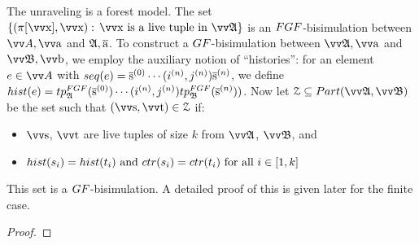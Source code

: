 \thminfunraveling*
\begin{proofsketch}
  The unraveling is a forest model.
  The set $\{(\pi[\elemtuptuplex], \elemtuptuplex):\, \elemtuptuplex\ \text{is a live tuple in}\ \unravel{A} \}$ is an $\FGF$-bisimulation between $\unraveldom{A}, \elemtuptuplea$ and ${\mathfrak{A}}, \overline{\mathrm{a}}$.
  To construct a $\GF$-bisimulation between $\unravel{A}, \elemtuptuplea$ and $\unravel{B}, \elemtuptupleb$, we employ the auxiliary notion of ``histories'': for an element $e \in \unraveldom{A}$ with $\seq{e} = \elemtuples^{(0)}\cdots(i^{(n)}, j^{(n)})\elemtuples^{(n)}$, we define $\mathsf{hist}(e) = \tp{\FGF}{\str{A}}{\elemtuples^{(0)}} \cdots (i^{(n)}, j^{(n)}) \tp{\FGF}{\str{B}}{\elemtuples^{(n)}})$.
  Now let $\bisimZ \subseteq \PartIso{\unravel{A}}{\unravel{B}}$ be the set such that $(\elemtuptuples, \elemtuptuplet) \in \bisimZ$ if:
  \begin{itemize}
    \item $\elemtuptuples$, $\elemtuptuplet$ are live tuples of size $k$ from $\unravel{A}$, $\unravel{B}$, and
    \item $\mathsf{hist}(s_{i}) = \mathsf{hist}(t_{i})\text{ and }\ctr{s_{i}} = \ctr{t_{i}}\text{ for all }i \in [1, k]$
  \end{itemize}
  This set is a $\GF$-bisimulation.
  A detailed proof of this is given later for the finite case.
\end{proofsketch}
\begin{proof}
\end{proof}
